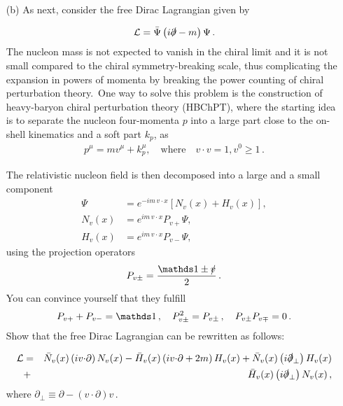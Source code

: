 \documentclass[11pt]{latex/exercise}
\begin{document}
\begin{itemize}
    \item[(b)]As next, consider the free Dirac Lagrangian given by

          \begin{eqnarray}
              \mathcal{L} = \bar \Psi \left( i \slashed{\partial}  - m \right) \Psi
              \,.
          \end{eqnarray}
          The nucleon mass is not expected to vanish in the chiral limit and it is not small compared to the chiral symmetry-breaking scale, thus complicating the expansion in powers of momenta by breaking the power counting of chiral perturbation theory.~One way to solve this problem is the construction of heavy-baryon chiral perturbation theory (HBChPT), where the starting idea is to separate the nucleon four-momenta $p$ into a large part close to the on-shell kinematics and a soft part $k_p$, as
          \begin{gather}
              p^{\mu}=m v^{\mu} + k_p^{\mu},\quad \text{where}\quad v\cdot v=1, v^0\geq 1\,.
          \end{gather}


          The relativistic nucleon field is then decomposed into a large and a small component
          \begin{align}
              \Psi   & =e^{-im\,v\cdot x}\left[N_v(x)+H_v(x)\right],
              \\
              N_v(x) & =e^{im\,v\cdot x} P_{v+}\Psi,
              \\
              H_v(x) & =e^{im\,v\cdot x} P_{v-}\Psi,
          \end{align}
          using the projection operators
          \begin{equation}
              P_{v\pm}=\frac{\eins\pm\vs}{2}
              \,.
          \end{equation}
          You can convince yourself that they fulfill
          \begin{equation}
              P_{v+}+P_{v-}=\eins\,,\quad
              P_{v\pm}^2=P_{v\pm}\,,\quad
              P_{v\pm}P_{v\mp}=0\,.
          \end{equation}
          Show that the free Dirac Lagrangian can be rewritten as follows:

          \begin{eqnarray}
              \mathcal{L}
              &=&
              \bar N_v(x) \left( i v {\cdot} \partial \right) N_v(x) -  \bar H_v(x) \left( i v {\cdot} \partial + 2m  \right) H_v(x) +  \bar N_v(x) \left( i \slashed{\partial}_\perp \right) H_v(x)
              \nonumber
              \\
              &+& \bar H_v(x) \left(  i \slashed{\partial}_\perp  \right) N_v(x)\,,
              \label{DLag}
          \end{eqnarray}
          where $\partial_\perp \equiv \partial -  (v {\cdot} \partial) v$\,.
\end{itemize}
\end{document}

